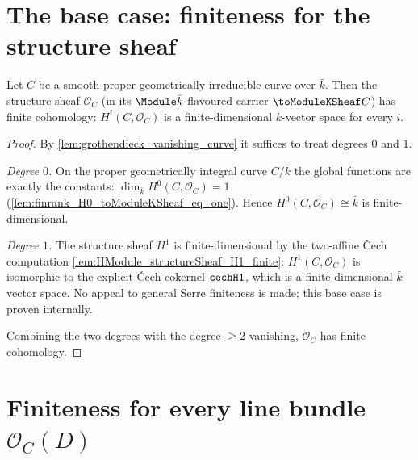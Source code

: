\section{The base case: finiteness for the structure sheaf}

\begin{lemma}
  \label{lem:HModule_structureSheaf_finite}
  Let \(C\) be a smooth proper geometrically irreducible curve over
  \(\bar k\). Then the structure sheaf \(\mathcal O_C\) (in its
  \(\Module \bar k\)-flavoured carrier \(\toModuleKSheaf C\)) has finite
  cohomology: \(H^i(C, \mathcal O_C)\) is a finite-dimensional
  \(\bar k\)-vector space for every \(i\).

\end{lemma}

\begin{proof}
  By \cref{lem:grothendieck_vanishing_curve} it suffices to treat
  degrees \(0\) and \(1\).

  \emph{Degree \(0\).} On the proper geometrically integral curve
  \(C / \bar k\) the global functions are exactly the constants:
  \(\dim_{\bar k} H^0(C, \mathcal O_C) = 1\)
  (\cref{lem:finrank_H0_toModuleKSheaf_eq_one}). Hence
  \(H^0(C, \mathcal O_C) \cong \bar k\) is finite-dimensional.

  \emph{Degree \(1\).} The structure sheaf \(H^1\) is finite-dimensional
  by the two-affine Čech computation
  \cref{lem:HModule_structureSheaf_H1_finite}: \(H^1(C, \mathcal O_C)\)
  is isomorphic to the explicit Čech cokernel \(\mathtt{cechH1}\), which is a
  finite-dimensional \(\bar k\)-vector space. No appeal to general Serre
  finiteness is made; this base case is proven internally.

  Combining the two degrees with the degree-\(\ge 2\) vanishing,
  \(\mathcal O_C\) has finite cohomology.
\end{proof}

\section{Finiteness for every line bundle \(\mathcal O_C(D)\)}

